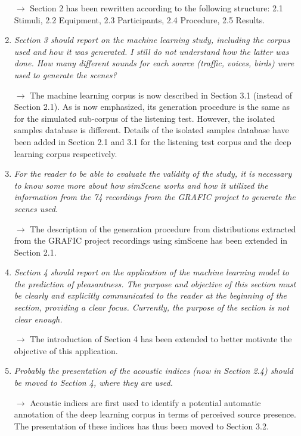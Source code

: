 \documentclass[10pt]{article}
\begin{document}
\begin{enumerate}
$\rightarrow$ Section 2 has been rewritten according to the following structure: 2.1 Stimuli, 2.2 Equipment, 2.3 Participants, 2.4 Procedure, 2.5 Results.

\item \emph{Section 3 should report on the machine learning study, including the corpus used and how it was generated. I still do not understand how the latter was done. How many different sounds for each source (traffic, voices, birds) were used to generate the scenes?}

$\rightarrow$ The machine learning corpus is now described in Section 3.1 (instead of Section 2.1). As is now emphasized, its generation procedure is the same as for the simulated sub-corpus of the listening test. However, the isolated samples database is different. Details of the isolated samples database have been added in Section 2.1 and 3.1  for the listening test corpus and the deep learning corpus respectively.

\item \emph{For the reader to be able to evaluate the validity of the study, it is necessary to know some more about how simScene works and how it utilized the information from the 74 recordings from the GRAFIC project to generate the scenes used.}

$\rightarrow$ The description of the generation procedure from distributions extracted from the GRAFIC project recordings using simScene has been extended in Section 2.1.

\item \emph{Section 4 should report on the application of the machine learning model to the prediction of pleasantness. The purpose and objective of this section must be clearly and explicitly communicated to the reader at the beginning of the section, providing a clear focus. Currently, the purpose of the section is not clear enough.}

$\rightarrow$ The introduction of Section 4 has been extended to better motivate the objective of this application.

\item \emph{Probably the presentation of the acoustic indices (now in Section 2.4) should be moved to Section 4, where they are used.}

$\rightarrow$ Acoustic indices are first used to identify a potential automatic annotation of the deep learning corpus in terms of perceived source presence. The presentation of these indices has thus been moved to Section 3.2.


\end{enumerate}
\end{document}

